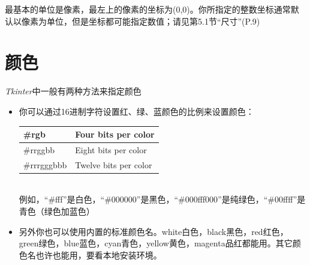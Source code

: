 最基本的单位是像素，最左上的像素的坐标为(0,0)。你所指定的整数坐标通常默认以像素为单位，但是坐标都可能指定数值；请见第5.1节“尺寸”(P.9)

\section{颜色}
\textit{Tkinter}中一般有两种方法来指定颜色
\begin{itemize}
\item
你可以通过16进制字符设置红、绿、蓝颜色的比例来设置颜色：
\\
\begin{tabular}{|l|l|}
\hline
\textsf{\#rgb} & Four bits per color \\ \hline
\textsf{\#rrggbb} & Eight bits per color \\ \hline
\textsf{\#rrrgggbbb} & Twelve bits per color \\ \hline
\end{tabular}
\\
例如，“\textsf{\#fff}”是白色，“\textsf{\#000000}”是黑色，“\textsf{\#000fff000}”是纯绿色，“\textsf{\#00ffff}”是青色（绿色加蓝色）
\item
另外你也可以使用内置的标准颜色名。\textsf{white}白色，\textsf{black}黑色，\textsf{red}红色，\textsf{green}绿色，\textsf{blue}蓝色，\textsf{cyan}青色，\textsf{yellow}黄色，\textsf{magenta}品红都能用。其它颜色名也许也能用，要看本地安装环境。

\end{itemize}